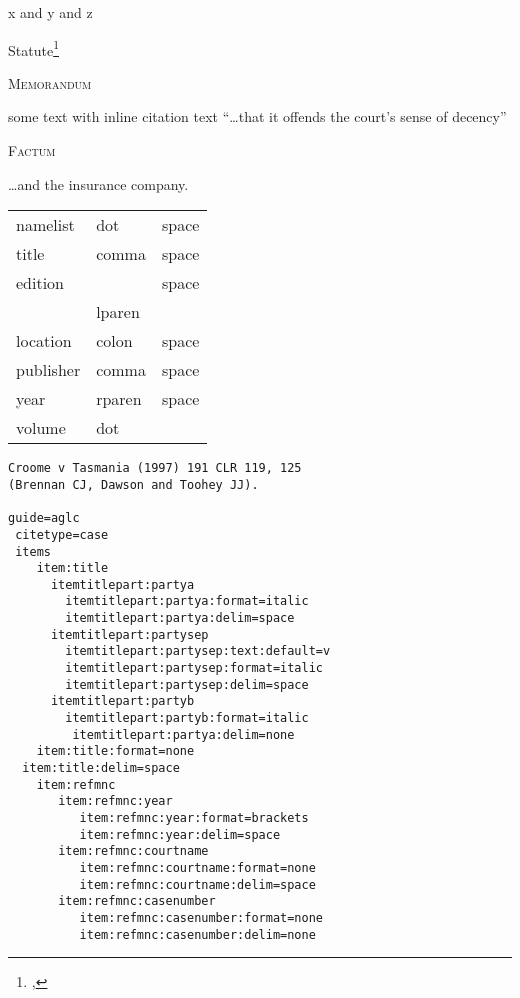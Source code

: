 x and y
 and z
 
Statute\footnote{, } 

\textsc{Memorandum} 

\medskip
some text with inline citation  text ``\ldots that it offends the court's sense of decency'' 

\bigskip
\textsc{Factum} 

\medskip
\ldots and the insurance company.

\medskip
{}



\bigskip
\begin{tabular}{lll}
namelist & dot & space \\
title & comma & space \\
edition & & space \\
 & lparen &  \\
location & colon & space \\
publisher & comma & space \\
year & rparen & space \\
volume & dot &  \\
\end{tabular}




\begin{verbatim}
Croome v Tasmania (1997) 191 CLR 119, 125 
(Brennan CJ, Dawson and Toohey JJ). 

guide=aglc
 citetype=case
 items
 	item:title
 	  itemtitlepart:partya
 	    itemtitlepart:partya:format=italic
 	    itemtitlepart:partya:delim=space
 	  itemtitlepart:partysep
 	    itemtitlepart:partysep:text:default=v
 	    itemtitlepart:partysep:format=italic
 	    itemtitlepart:partysep:delim=space
 	  itemtitlepart:partyb
  	    itemtitlepart:partyb:format=italic
 	     itemtitlepart:partya:delim=none
 	item:title:format=none
  item:title:delim=space
   	item:refmnc
   	   item:refmnc:year
   	      item:refmnc:year:format=brackets
   	      item:refmnc:year:delim=space   	      
   	   item:refmnc:courtname
   	      item:refmnc:courtname:format=none
   	      item:refmnc:courtname:delim=space 
   	   item:refmnc:casenumber
   	      item:refmnc:casenumber:format=none
   	      item:refmnc:casenumber:delim=none

\end{verbatim}


